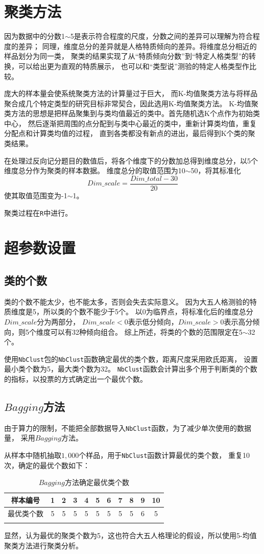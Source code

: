 \documentclass[UTF8]{ctexart}
\begin{document}
\section{聚类方法}
因为数据中的分数1$\sim$5是表示符合程度的尺度，分数之间的差异可以理解为符合程度的差异；
同理，维度总分的差异就是人格特质倾向的差异。将维度总分相近的样品划分为同一类，
聚类的结果实现了从“特质倾向分数”到“特定人格类型”的转换，可以给出更为直观的特质展示，
也可以和“类型说”测验的特定人格类型作比较。\par
庞大的样本量会使系统聚类方法的计算量过于巨大，
而K-均值聚类方法与将样品聚合成几个特定类型的研究目标非常契合，因此选用K-均值聚类方法。
K-均值聚类方法的思想是把样品聚集到与类均值最近的类中。首先随机选K个点作为初始类中心，
然后逐渐把周围的点分配到与类中心最近的类中，重新计算类均值，重复分配点和计算类均值的过程，
直到各类都没有新点的进出，最后得到K个类的聚类结果。\par
在处理过反向记分题目的数值后，将各个维度下的分数加总得到维度总分，以5个维度总分作为聚类的样本数据。
维度总分的取值范围为10$\sim$50，将其标准化
\begin{equation}
  Dim\_scale = \frac{Dim\_total-30}{20}
\end{equation}
使其取值范围变为-1$\sim$1。\par
聚类过程在\texttt{R}中进行。
\section{超参数设置}
\subsection*{类的个数}
类的个数不能太少，也不能太多，否则会失去实际意义。
因为大五人格测验的特质维度是5，所以类的个数不能少于5个。
以0为临界点，将标准化后的维度总分$Dim\_scale$分为两部分，
$Dim\_scale<0$表示低分倾向，$Dim\_scale>0$表示高分倾向，则5个维度可以有32种倾向组合。
综上所述，将类的个数的范围限定在5$\sim$32个。\par
使用\texttt{NbClust}包的\texttt{NbClust}函数确定最优的类个数，距离尺度采用欧氏距离，
设置最小类个数为5，最大类个数为32。
\texttt{NbClust}函数会计算出多个用于判断类的个数的指标，以投票的方式确定出一个最优个数。
\subsection*{$Bagging$方法}
由于算力的限制，不能把全部数据导入\texttt{NbClust}函数，为了减少单次使用的数据量，
采用$Bagging$方法。\par
从样本中随机抽取$1,000$个样品，用于\texttt{NbClust}函数计算最优的类个数，
重复10次，确定的最优个数如下：
\begin{longtable}{c|cccccccccc}
  \hline
  样本编号  & 1 & 2 & 3 & 4 & 5 & 6 & 7 & 8 & 9 & 10 \\\hline
  最优类个数 & 5 & 5 & 5 & 5 & 5 & 5 & 5 & 5 & 6 & 5  \\\hline
  \caption{$Bagging$方法确定最优类个数}
\end{longtable}
显然，认为最优的聚类个数为5，这也符合大五人格理论的假设，所以使用5-均值聚类方法进行聚类分析。
\end{document}
